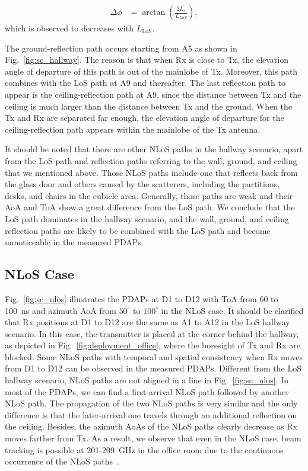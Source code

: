 \documentclass[journal,12pt,draftclsnofoot,onecolumn]{IEEEtran}
\begin{document}
\begin{equation}
\begin{split}
    \Delta \phi&=\arctan{(\frac{2L_r}{L_{LoS}})},
\end{split}
\end{equation}
which is observed to decreases with $L_{\text{LoS}}$.
\par The ground-reflection path occurs starting from A5 as shown in Fig.~\ref{fig:sc_hallway}. The reason is that when Rx is close to Tx, the elevation angle of departure of this path is out of the mainlobe of Tx. Moreover, this path combines with the LoS path at A9 and thereafter. The last reflection path to appear is the ceiling-reflection path at A9, since the distance between Tx and the ceiling is much larger than the distance between Tx and the ground. When the Tx and Rx are separated far enough, the elevation angle of departure for the ceiling-reflection path appears within the mainlobe of the Tx antenna. 
\par It should be noted that there are other NLoS paths in the hallway scenario, apart from the LoS path and reflection paths referring to the wall, ground, and ceiling that we mentioned above. Those NLoS paths include one that reflects back from the glass door and others caused by the scatterers, including the partitions, desks, and chairs in the cubicle area. Generally, those paths are weak and their AoA and ToA show a great difference from the LoS path. We conclude that the LoS path dominates in the hallway scenario, and the wall, ground, and ceiling reflection paths are likely to be combined with the LoS path and become unnoticeable in the measured PDAPs.

\subsection{NLoS Case}
Fig.~\ref{fig:sc_nlos} illustrates the PDAPs at D1 to D12 with ToA from 60 to 100~ns and azimuth AoA from $50^\circ$ to $100^\circ$ in the NLoS case. It should be clarified that Rx positions at D1 to D12 are the same as A1 to A12 in the LoS hallway scenario. In this case, the transmitter is placed at the corner behind the hallway, as depicted in Fig.~\ref{fig:deployment_office}, where the boresight of Tx and Rx are blocked. Some NLoS paths with temporal and spatial consistency when Rx moves from D1 to D12 can be observed in the measured PDAPs. Different from the LoS hallway scenario, NLoS paths are not aligned in a line in Fig.~\ref{fig:sc_nlos}. In most of the PDAPs, we can find a first-arrival NLoS path followed by another NLoS path. The propagation of the two NLoS paths is very similar and the only difference is that the later-arrival one travels through an additional reflection on the ceiling. Besides, the azimuth AoAs of the NLoS paths clearly decrease as Rx moves farther from Tx. As a result, we observe that even in the NLoS case, beam tracking is possible at 201-209~GHz in the office room due to the continuous occurrence of the NLoS paths~\cite{chen2021millidegree}.
\end{document}
